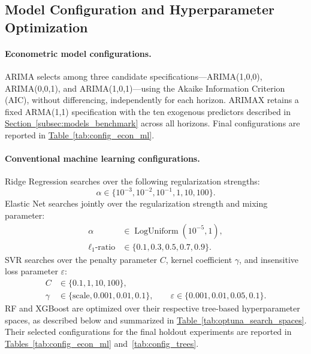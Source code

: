 \documentclass[runningheads,orivec]{llncs}
\begin{document}
\subsection{Model Configuration and Hyperparameter Optimization}\label{subsec:model_config}

\paragraph{Econometric model configurations.} ARIMA selects among three candidate specifications---ARIMA(1,0,0), ARIMA(0,0,1), and ARIMA(1,0,1)---using the Akaike Information Criterion (AIC), without differencing, independently for each horizon. ARIMAX retains a fixed ARMA(1,1) specification with the ten exogenous predictors described in \hyperref[subsec:models_benchmark]{Section~\ref*{subsec:models_benchmark}} across all horizons. Final configurations are reported in \hyperref[tab:config_econ_ml]{Table~\ref*{tab:config_econ_ml}}.

\paragraph{Conventional machine learning configurations.} Ridge Regression searches over the following regularization strengths:
\begin{equation}
\alpha \in \{10^{-3},10^{-2},10^{-1},1,10,100\}.
\end{equation}
Elastic Net searches jointly over the regularization strength and mixing parameter:
\begin{equation}
\begin{aligned}
\alpha &\in \operatorname{LogUniform}(10^{-5},1),\\
\ell_1\text{-ratio} &\in \{0.1,0.3,0.5,0.7,0.9\}.
\end{aligned}
\end{equation}
SVR searches over the penalty parameter $C$, kernel coefficient $\gamma$, and insensitive loss parameter $\varepsilon$:
\begin{equation}
\begin{aligned}
C &\in \{0.1,1,10,100\},\\
\gamma &\in \{\text{scale},0.001,0.01,0.1\},
\qquad
\varepsilon \in \{0.001,0.01,0.05,0.1\}.
\end{aligned}
\end{equation}
RF and XGBoost are optimized over their respective tree-based hyperparameter spaces, as described below and summarized in \hyperref[tab:optuna_search_spaces]{Table~\ref*{tab:optuna_search_spaces}}. Their selected configurations for the final holdout experiments are reported in \hyperref[tab:config_econ_ml]{Tables~\ref*{tab:config_econ_ml}} and~\hyperref[tab:config_trees]{\ref*{tab:config_trees}}.
\end{document}
